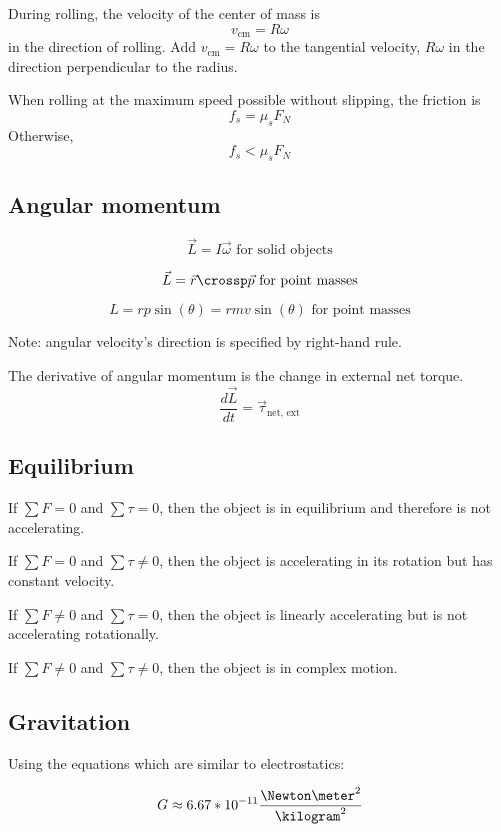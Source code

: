During rolling, the velocity of the center of mass is
\[
	v_\text{cm} = R\omega
\]
in the direction of rolling. Add $v_\text{cm} = R\omega$ to the tangential velocity, $R\omega$ in the direction perpendicular to the radius.

When rolling at the maximum speed possible without slipping, the friction is
\[
	f_s = \mu_s F_N
\]
Otherwise,
\[
	f_s < \mu_s F_N
\]

\subsection{Angular momentum}

\[
	\vec{L} = I \vec{\omega} \text{ for solid objects}
\]

\[
	\vec{L} = \vec{r} \crossp \vec{p} \text{ for point masses}
\]

\[
	L = rp\sin(\theta) = rmv\sin(\theta) \text{ for point masses}
\]

Note: angular velocity's direction is specified by right-hand rule.

The derivative of angular momentum is the change in external net torque.
\[
	\frac{d\vec{L}}{dt} = \vec{\tau}_\text{net, ext}
\]

\subsection{Equilibrium}

If $\sum F = 0$ and $\sum \tau = 0$, then the object is in equilibrium and therefore is not accelerating.

If $\sum F = 0$ and $\sum \tau \neq 0$, then the object is accelerating in its rotation but has constant velocity.

If $\sum F \neq 0$ and $\sum \tau = 0$, then the object is linearly accelerating but is not accelerating rotationally.

If $\sum F \neq 0$ and $\sum \tau \neq 0$, then the object is in complex motion.

\subsection{Gravitation}

Using the equations which are similar to electrostatics:

\begin{definition}
	\[
		G \approx 6.67 * 10^{-11} \frac{\Newton \meter^2}{\kilogram^2}
	\]
\end{definition}

